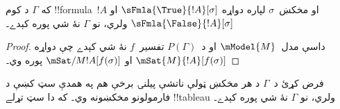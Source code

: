 \documentclass[../../../include/open-logic-section]{subfiles}
\begin{document}
\begin{prop}
  که $\Gamma$ د کوم !!{formula}~$!A$ او مخکښ~$\sigma$ لپاره
  دواړه $\sFmla{\True}{!A}[\sigma]$ او
  $\sFmla{\False}{!A}[\sigma]$ ولري، نو $\Gamma$ نۀ شي
  پوره کېدے۔
\end{prop}

\begin{proof}
  داسې مدل~$\mModel{M}$ او د~$P(\Gamma)$ تفسير~$f$ نۀ شي
  کېدے چې دواړه $\mSat{M}{!A}[f(\sigma)]$ او
  $\mSat/{M}{!A}[f(\sigma)]$ پوره وي۔
\end{proof}

\begin{thm}[سموالی]
  فرض کړئ د~$\Gamma$ د هر مخکښ ټولې ناتشې پيلنۍ برخې هم په
  همدې سټ کښې د فارمولونو مخکښونه وي۔ که دا سټ تړلے !!{tableau}
  ولري، نو $\Gamma$ نۀ شي پوره کېدے۔
\end{thm}
\end{document}
